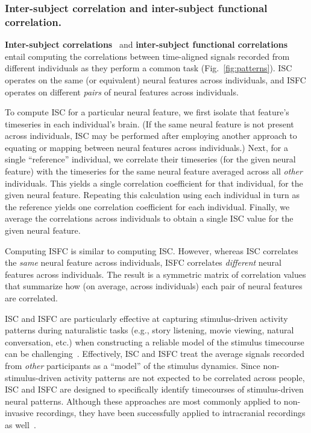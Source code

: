 \documentclass[runningheads]{llncs}
\begin{document}
\subsubsection{Inter-subject correlation and inter-subject functional
  correlation.}
\textbf{Inter-subject correlations}~\citep[ISC;][]{HassEtal04} and
\textbf{inter-subject functional correlations}~\citep[ISFC;][]{SimoEtal16}
entail computing the correlations between time-aligned signals
recorded from different individuals as they perform a common task
(Fig.~\ref{fig:patterns}).  ISC operates on the same (or equivalent)
neural features across individuals, and ISFC operates on different
\textit{pairs} of neural features across individuals.

To compute ISC for a particular neural feature, we first isolate that
feature's timeseries in each individual's brain.  (If the same neural
feature is not present across individuals, ISC may be performed after
employing another approach to equating or mapping between neural
features across individuals.)  Next, for a single ``reference''
individual, we correlate their timeseries (for the given neural
feature) with the timeseries for the same neural feature averaged
across all \textit{other} individuals.  This yields a single
correlation coefficient for that individual, for the given neural
feature.  Repeating this calculation using each individual in turn
as the reference yields one correlation coefficient for each
individual.  Finally, we average the correlations across individuals
to obtain a single ISC value for the given neural feature.

Computing ISFC is similar to computing ISC.  However, whereas ISC
correlates the \textit{same} neural feature across individuals, ISFC
correlates \textit{different} neural features across individuals.  The
result is a symmetric matrix of correlation values that summarize how
(on average, across individuals) each pair of neural features are
correlated.

ISC and ISFC are particularly effective at capturing stimulus-driven
activity patterns during naturalistic tasks (e.g., story listening,
movie viewing, natural conversation, etc.) when constructing a
reliable model of the stimulus timecourse can be
challenging~\citep{SimoChan20}.  Effectively, ISC and ISFC treat the
average signals recorded from \textit{other} participants as a
``model'' of the stimulus dynamics.  Since non-stimulus-driven
activity patterns are not expected to be correlated across people, ISC
and ISFC are designed to specifically identify timecourses of
stimulus-driven neural patterns.  Although these approaches are most
commonly applied to non-invasive recordings, they have been
successfully applied to intracranial recordings as
well~\citep{MukaEtal05, HoneEtal12a, PoteEtal14, HaufEtal18}.
\end{document}
